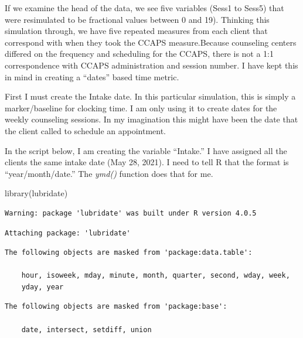 \documentclass[
  english,
]{book}
\newenvironment{Shaded}{\begin{snugshade}}{\end{snugshade}}
\newcommand{\FunctionTok}[1]{\textcolor[rgb]{0.00,0.00,0.00}{#1}}
\newcommand{\NormalTok}[1]{#1}
\newcommand{\OtherTok}[1]{\textcolor[rgb]{0.56,0.35,0.01}{#1}}
\newcommand{\SpecialCharTok}[1]{\textcolor[rgb]{0.00,0.00,0.00}{#1}}
\newcommand{\StringTok}[1]{\textcolor[rgb]{0.31,0.60,0.02}{#1}}
\begin{document}
If we examine the head of the data, we see five variables (Sess1 to Sess5) that were resimulated to be fractional values between 0 and 19). Thinking this simulation through, we have five repeated measures from each client that correspond with when they took the CCAPS measure.Because counseling centers differed on the frequency and scheduling for the CCAPS, there is not a 1:1 correspondence with CCAPS administration and session number. I have kept this in mind in creating a ``dates'' based time metric.

First I must create the Intake date. In this particular simulation, this is simply a marker/baseline for clocking time. I am only using it to create dates for the weekly counseling sessions. In my imagination this might have been the date that the client called to schedule an appointment.

In the script below, I am creating the variable ``Intake.'' I have assigned all the clients the same intake date (May 28, 2021). I need to tell R that the format is ``year/month/date.'' The \emph{ymd()} function does that for me.

\begin{Shaded}
\begin{Highlighting}[]
\FunctionTok{library}\NormalTok{(lubridate)}
\end{Highlighting}
\end{Shaded}

\begin{verbatim}
Warning: package 'lubridate' was built under R version 4.0.5
\end{verbatim}

\begin{verbatim}
Attaching package: 'lubridate'
\end{verbatim}

\begin{verbatim}
The following objects are masked from 'package:data.table':

    hour, isoweek, mday, minute, month, quarter, second, wday, week,
    yday, year
\end{verbatim}

\begin{verbatim}
The following objects are masked from 'package:base':

    date, intersect, setdiff, union
\end{verbatim}

\begin{Shaded}
\end{Shaded}
\end{document}
